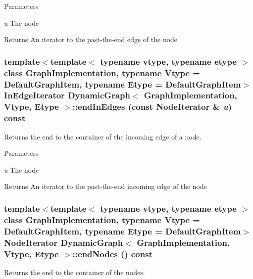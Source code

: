 \begin{DoxyParams}{Parameters}
\item[{\em u}]The node\end{DoxyParams}
\begin{DoxyReturn}{Returns}
An iterator to the past-\/the-\/end edge of the node 
\end{DoxyReturn}
\hypertarget{class_dynamic_graph_a4c3d5c37c993efd3a1e91b80e2323635}{
\subsubsection[{endInEdges}]{\setlength{\rightskip}{0pt plus 5cm}template$<$template$<$ typename vtype, typename etype $>$ class GraphImplementation, typename Vtype  = DefaultGraphItem, typename Etype  = DefaultGraphItem$>$ InEdgeIterator {\bf DynamicGraph}$<$ GraphImplementation, Vtype, Etype $>$::endInEdges (const NodeIterator \& {\em u}) const}}
\label{class_dynamic_graph_a4c3d5c37c993efd3a1e91b80e2323635}


Returns the end to the container of the incoming edge of a node. 


\begin{DoxyParams}{Parameters}
\item[{\em u}]The node\end{DoxyParams}
\begin{DoxyReturn}{Returns}
An iterator to the past-\/the-\/end incoming edge of the node 
\end{DoxyReturn}
\hypertarget{class_dynamic_graph_aad1f2b2f345476a1abe94c2f4dc45a9c}{
\subsubsection[{endNodes}]{\setlength{\rightskip}{0pt plus 5cm}template$<$template$<$ typename vtype, typename etype $>$ class GraphImplementation, typename Vtype  = DefaultGraphItem, typename Etype  = DefaultGraphItem$>$ NodeIterator {\bf DynamicGraph}$<$ GraphImplementation, Vtype, Etype $>$::endNodes () const}}
\label{class_dynamic_graph_aad1f2b2f345476a1abe94c2f4dc45a9c}


Returns the end to the container of the nodes. 

